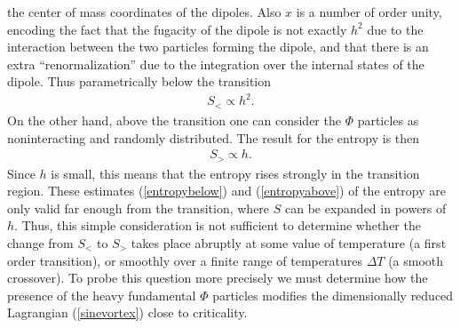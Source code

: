 \documentclass[a4paper,aps,prd,superscriptaddress,showpacs,showkeys]{revtex4}
\begin{document}
the center of mass coordinates of the dipoles. Also $x$ is a number of
order unity, encoding the fact that the fugacity of the dipole is not
exactly $h^2$ due to the interaction between the two particles forming
the dipole, and that there is an extra ``renormalization'' due to  the
integration over the internal states of the dipole. Thus parametrically
below the transition
\begin{eqnarray}
S_<\propto h^2 .
\label{entropybelow}
\end{eqnarray}
On the other hand, above the transition one can consider the
$\Phi$ particles as noninteracting and randomly distributed.  The result
for the entropy is then
\begin{eqnarray}
S_>\propto h .
\label{entropyabove}
\end{eqnarray}
Since $h$ is small, this means that the entropy rises strongly in
the transition region.   These estimates (\ref{entropybelow}) and
(\ref{entropyabove}) of the entropy are only valid far enough from the
transition, where $S$ can be expanded in powers of $h$. Thus, this simple
consideration is not sufficient to determine whether the change from
$S_<$
to $S_>$ takes place abruptly at some value of temperature
(a first order transition),  or smoothly over a finite range of
temperatures $\Delta T$ (a smooth crossover).
To probe this question more precisely we must determine how the presence
of
the heavy fundamental $\Phi$ particles modifies the dimensionally reduced
Lagrangian (\ref{sinevortex}) close to criticality.
\end{document}
